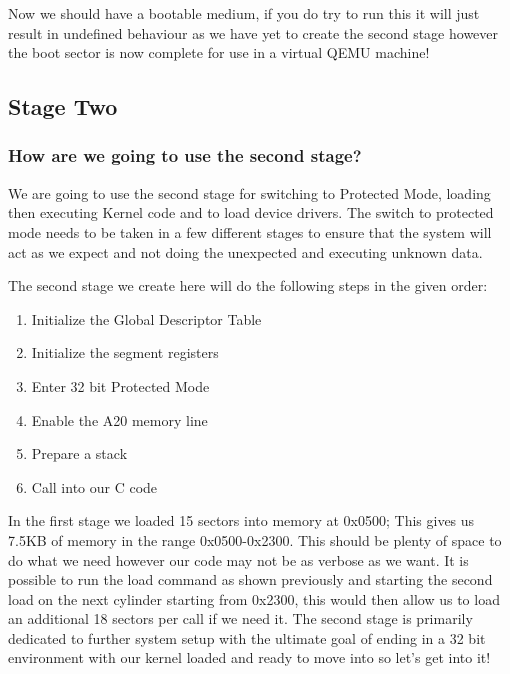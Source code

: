 \documentclass[10pt,a4paper]{article}
\begin{document}
Now we should have a bootable medium, if you do try to run this it will just result in undefined behaviour as we have yet to create the second stage however the boot sector is now complete for use in a virtual QEMU machine!

\newpage

\subsection{Stage Two}
\subsubsection{How are we going to use the second stage?}
We are going to use the second stage for switching to Protected Mode, loading then executing Kernel code and to load device drivers. The switch to protected mode needs to be taken in a few different stages to ensure that the system will act as we expect and not doing the unexpected and executing unknown data. \medskip

The second stage we create here will do the following steps in the given order:
\begin{enumerate}
\item{Initialize the Global Descriptor Table}
\item{Initialize the segment registers}
\item{Enter 32 bit Protected Mode}
\item{Enable the A20 memory line}
\item{Prepare a stack}
\item{Call into our C code}
\end{enumerate}

In the first stage we loaded 15 sectors into memory at 0x0500; This gives us 7.5KB of memory in the range 0x0500-0x2300. This should be plenty of space to do what we need however our code may not be as verbose as we want. It is possible to run the load command as shown previously and starting the second load on the next cylinder starting from 0x2300, this would then allow us to load an additional 18 sectors per call if we need it. The second stage is primarily dedicated to further system setup with the ultimate goal of ending in a 32 bit environment with our kernel loaded and ready to move into so let's get into it!

\newpage
\end{document}
